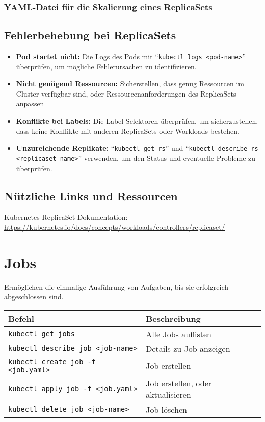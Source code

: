 \subsubsection{YAML-Datei für die Skalierung eines ReplicaSets}


\subsection{Fehlerbehebung bei ReplicaSets}
\begin{itemize}
    \item \textbf{Pod startet nicht:} Die Logs des Pods mit \enquote{\texttt{kubectl logs <pod-name>}} überprüfen, um mögliche Fehlerursachen zu identifizieren.
    \item \textbf{Nicht genügend Ressourcen:} Sicherstellen, dass genug Ressourcen im Cluster verfügbar sind, oder Ressourcenanforderungen des ReplicaSets anpassen
    \item \textbf{Konflikte bei Labels:} Die Label-Selektoren überprüfen, um sicherzustellen, dass keine Konflikte mit anderen ReplicaSets oder Workloads bestehen.
    \item \textbf{Unzureichende Replikate:} \enquote{\texttt{kubectl get rs}} und \enquote{\texttt{kubectl describe rs <replicaset-name>}} verwenden, um den Status und eventuelle Probleme zu überprüfen.
\end{itemize}

\subsection{Nützliche Links und Ressourcen}
Kubernetes ReplicaSet Dokumentation:\\
\url{https://kubernetes.io/docs/concepts/workloads/controllers/replicaset/}\\


\section{Jobs}
Ermöglichen die einmalige Ausführung von Aufgaben, bis sie erfolgreich abgeschlossen sind. \\

\noindent
\begin{tabular}{
|l|l|}
\hline
\textbf{Befehl} & \textbf{Beschreibung} \\
\hline
\texttt{kubectl get jobs} & Alle Jobs auflisten \\
\texttt{kubectl describe job <job-name>} & Details zu Job anzeigen \\
\texttt{kubectl create job -f <job.yaml>} & Job erstellen\\
\texttt{kubectl apply job -f <job.yaml>} & Job erstellen, oder aktualisieren\\
\texttt{kubectl delete job <job-name>} & Job löschen \\
\hline
\end{tabular}

